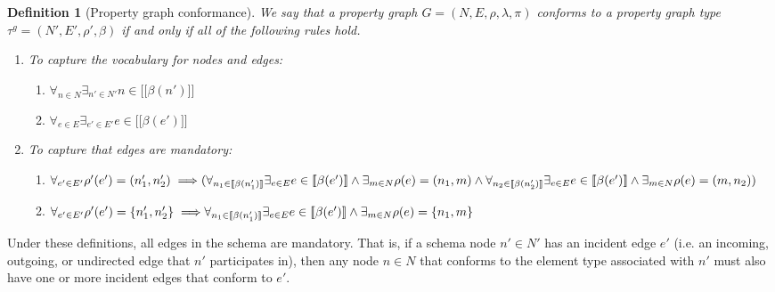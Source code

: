 \documentclass[a4paper]{article}
\newtheorem{definition}[theorem]{Definition}
\newcommand{\gtype}{\tau^g}
\newcommand{\lsem}{\ensuremath{[\![}}
\newcommand{\rsem}{\ensuremath{]\!]}}
\newcommand{\sem}[1]{\ensuremath{\lsem #1 \rsem}}
\begin{document}

\begin{definition}[Property graph conformance]
  We say that a property graph $G = (N, E, \rho, \lambda, \pi)$ \emph{conforms} to a property graph type $\gtype = (N', E', \rho', \beta)$ if and only if all of the following rules hold.

  \begin{enumerate}
    \item To capture the vocabulary for nodes and edges:
    \begin{enumerate}
      \item $\forall_{n \in N} \exists_{n' \in N'} n \in \sem{\beta(n')}$
      \item $\forall_{e \in E} \exists_{e' \in E'} e \in \sem{\beta(e')}$
    \end{enumerate}
    \item To capture that edges are mandatory:
    \begin{enumerate}
      \item $\forall_{e' \in E'} \rho'(e') = (n'_1, n'_2) \implies
      \\\\(\forall_{n_1 \in \sem{\beta(n'_1)}} \exists_{e \in E} e \in \sem{\beta(e')} \wedge \exists_{m \in N} \rho(e) = (n_1, m) \wedge
      \\\\ \forall_{n_2 \in \sem{\beta(n'_2)}} \exists_{e \in E} e \in \sem{\beta(e')} \wedge \exists_{m \in N} \rho(e) = (m, n_2))$

      \item $\forall_{e' \in E'} \rho'(e') = \{n'_1, n'_2\} \implies
      \\\\\forall_{n_1 \in \sem{\beta(n'_1)}} \exists_{e \in E} e \in \sem{\beta(e')} \wedge \exists_{m \in N} \rho(e) = \{n_1, m\}$
    \end{enumerate}
  \end{enumerate}
\end{definition}

Under these definitions, all edges in the schema are mandatory. That is, if a schema node $n' \in N'$ has an incident edge $e'$ (i.e. an incoming, outgoing, or undirected edge that $n'$ participates in), then any node $n \in N$ that conforms to the element type associated with $n'$ must also have one or more incident edges that conform to $e'$.

\end{document}
